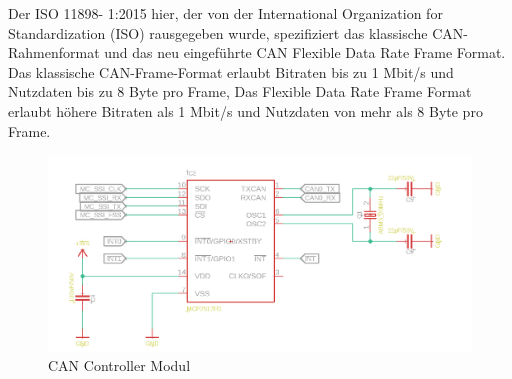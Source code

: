 Der ISO 11898- 1:2015 hier, der von der International Organization for Standardization (ISO) rausgegeben wurde, spezifiziert das klassische CAN-Rahmenformat und das neu eingeführte CAN Flexible Data Rate Frame Format. Das klassische CAN-Frame-Format erlaubt Bitraten bis zu 1 Mbit/s und Nutzdaten bis zu 8 Byte pro Frame, Das Flexible Data Rate Frame Format erlaubt höhere Bitraten als 1 Mbit/s und Nutzdaten von mehr als 8 Byte pro Frame.

\begin{figure}[H]
	\begin{center}
		\includegraphics[width=1\textwidth]{./images/mcp_eagle.jpg}
	\end{center}
	\vspace{-5pt}
	\caption[CAN Controller Modul]{CAN Controller Modul} %
	\label{fig:can:controller}
	\vspace{-5pt}
\end{figure}

